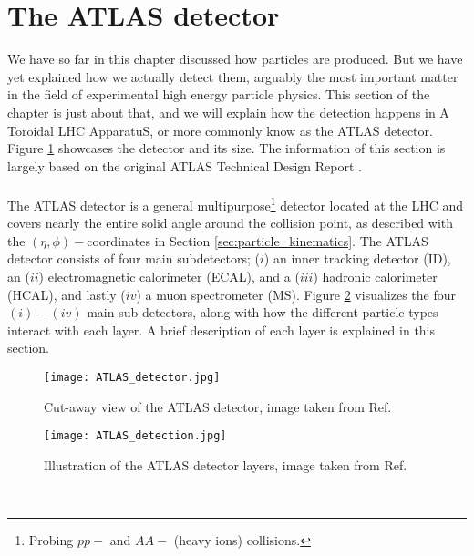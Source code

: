 \documentclass[12pt, a4paper]{book}
\begin{document}
\section{The ATLAS detector}\label{sec:ATLAS}
We have so far in this chapter discussed how particles are produced. But we have yet explained how we actually detect them, arguably the most important matter in the field of experimental high energy particle physics.
This section of the chapter is just about that, and we will explain how the detection happens in A Toroidal LHC ApparatuS, or more commonly know as the ATLAS detector. Figure \ref{fig:ATLAS_detector} showcases 
the detector and its size. The information of this section is largely based on the original ATLAS Technical Design Report \cite{Aad:1129811}.\\
\\The ATLAS detector is a general multipurpose\footnote{Probing $pp-$ and $AA-$ (heavy ions) collisions.} detector located at the LHC and covers nearly the entire solid angle 
around the collision point, as described with the $(\eta,\phi)-$coordinates in Section \ref{sec:particle_kinematics}. The ATLAS detector consists of four main subdetectors; ($i$) an inner tracking detector (ID), 
an ($ii$) electromagnetic calorimeter (ECAL), and a ($iii$) hadronic calorimeter (HCAL), and lastly ($iv$) a muon spectrometer (MS). Figure \ref{fig:ATLAS_layers} visualizes the four $(i)-(iv)$ main sub-detectors, 
along with how the different particle types interact with each layer. A brief description of each layer is explained in this section.
\begin{figure}[!ht]
	\centering
    \texttt{[image: ATLAS\_detector.jpg]}
    \caption[The ATLAS detector]{Cut-away view of the ATLAS detector, image taken from Ref. \cite{Aad:1129811}}\label{fig:ATLAS_detector}
\end{figure}
\begin{figure}[!ht]
	\centering
    \texttt{[image: ATLAS\_detection.jpg]}
    \caption[Illustration of the ATLAS detector layers]{Illustration of the ATLAS detector layers, image taken from Ref. \cite{Pequenao:1505342}}\label{fig:ATLAS_layers}
\end{figure}
\\
\end{document}
